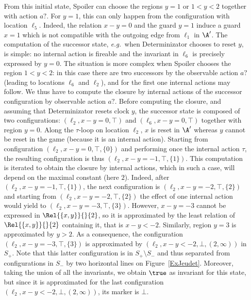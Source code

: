 \documentclass{LMCS}
\theoremstyle{plain}\newtheorem{proposition}[thm]{Proposition}
\def\eg{{\em e.g.}}
\begin{document}
\begin{exa}
From this initial state, Spoiler can choose the regions $y=1$ or
$1<y<2$ together with action $a?$. For $y=1$, this can only happen
from the configuration with location $\ell_5$. Indeed, the relation $x
-y =0$ and the guard $y=1$ induce a guard $x=1$ which is not
compatible with the outgoing edge from $\ell_1$ in $\A'$. The
computation of the successor state, \eg~when Determinizator chooses to
reset $y$, is simple: no internal action is fireable and the
invariant in $\ell_6$ is precisely expressed by $y=0$. The situation
is more complex when Spoiler chooses the region $1<y<2$: in this case
there are two successors by the observable action $a?$ (leading to
locations $\ell_6$ and $\ell_2$), and for the first one internal actions
may follow. We thus have to compute the closure by internal actions of
the successor configuration by observable action $a?$. Before
computing the closure, and assuming that Determinizator resets clock
$y$, the successor state is composed of two configurations:
$(\ell_2,x-y =0,\top)$ and $(\ell_6,x-y=0,\top)$ together with region
$y=0$. Along the $\tau$-loop on location $\ell_2$, $x$ is reset in
$\A'$ whereas $y$ cannot be reset in the game (because it is an
internal action). Starting from configuration $(\ell_2,x-y
=0,\top,\{0\})$ and performing once the internal action $\tau$, the
resulting configuration is thus $(\ell_2,x-y =-1,\top,\{1\})$. This
computation is iterated to obtain the closure by internal actions,
which in such a case, will depend on the maximal constant (here
$2$). Indeed, after $(\ell_2,x-y =-1,\top,\{1\})$, the next
configuration is $(\ell_2,x-y=-2,\top,\{2\})$ and starting from
$(\ell_2,x-y=-2,\top,\{2\})$ the effect of one internal action would
yield to $(\ell_2,x-y=-3,\top,\{3\})$. However, $x-y =-3$ cannot be
expressed in $\Rel{\{x,y\}}{}{2}$, so it is approximated by the least
relation of $\Rel{\{x,y\}}{}{2}$ containing it, that is
$x-y<-2$. Similarly, region $y=3$ is approximated by $y>2$. As a
consequence, the configuration $(\ell_2,x-y=-3,\top,\{3\})$ is
approximated by $(\ell_2,x-y<-2,\bot,(2,\infty))$ in $S_+$. Note that
this latter configuration is in $S_+ \setminus S_-$ and thus separated
from configurations in $S_-$ by two horizontal lines on
Figure~\ref{ExJeudet}.
Moreover, taking the union of all the invariants, we obtain $\true$ as
invariant for this state, but since it is approximated for the last
configuration $(\ell_2,x-y<-2,\bot,(2,\infty))$, its marker is $\bot$.
\end{exa}
\end{document}
